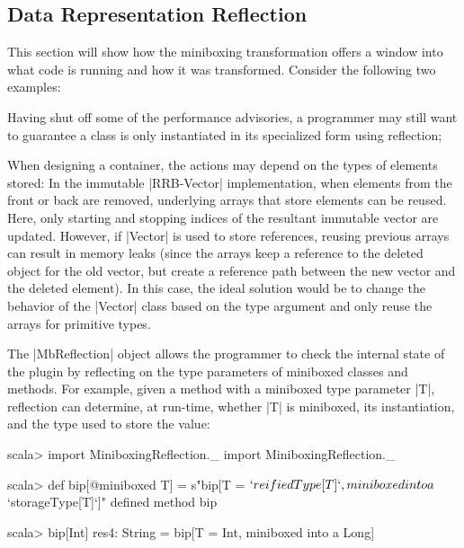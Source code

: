 \subsection{Data Representation Reflection}


This section will show how the miniboxing transformation offers a window into what code is running and how it was transformed. Consider the following two examples:

\begin{compactitem}
\item Having shut off some of the performance advisories, a programmer may still want to guarantee a class is only instantiated in its specialized form using reflection;
\item When designing a container, the actions may depend on the types of elements stored: In the immutable |RRB-Vector| \cite{nicolas-thesis} implementation, when elements from the front or back are removed, underlying arrays that store elements can be reused. Here, only starting and stopping indices of the resultant immutable vector are updated. However, if |Vector| is used to store references, reusing previous arrays can result in memory leaks (since the arrays keep a reference to the deleted object for the old vector, but create a reference path between the new vector and the deleted element). In this case, the ideal solution would be to change the behavior of the |Vector| class based on the type argument and only reuse the arrays for primitive types.
\end{compactitem}

The |MbReflection| object allows the programmer to check the internal state of the plugin by reflecting on the type parameters of miniboxed classes and methods. For example, given a method with a miniboxed type parameter |T|, reflection can determine, at run-time, whether |T| is miniboxed, its instantiation, and the type used to store the value:

\begin{lstlisting-nobreak}
 scala> import MiniboxingReflection._
 import MiniboxingReflection._

 scala> def bip[@miniboxed T] = s"bip[T = ${`reifiedType[T]`}, miniboxed into a ${`storageType[T]`}]"
 defined method bip

 scala> bip[Int]
 res4: String = bip[T = Int, miniboxed into a Long]
\end{lstlisting-nobreak}

